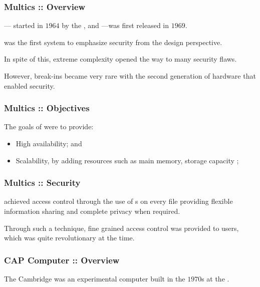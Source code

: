 \begin{frame}
  \frametitle{Multics :: Overview}

  ---
  started in $1964$ by the ,  and
  ---was first released in $1969$.

  \-

   was the first system to emphasize security from the
  design perspective.

  \-

  In spite of this,  extreme complexity opened the way to many
  security flaws.

  \-

  However, break-ins became very rare with the second generation of hardware
  that enabled  security.
\end{frame}


\begin{frame}
  \frametitle{Multics :: Objectives}

  The goals of  were to provide:

  \begin{itemize}
    \item
      High availability; and
    \item
      Scalability, by adding resources such as main memory, storage capacity
      \etc{};
  \end{itemize}
\end{frame}


\begin{frame}
  \frametitle{Multics :: Security}

   achieved access control through the use of s on every file providing flexible information sharing and
  complete privacy when required.

  \-

  Through such a technique, fine grained access control was provided to users,
  which was quite revolutionary at the time.
\end{frame}


\begin{frame}
  \frametitle{CAP Computer :: Overview}

  The Cambridge  was an experimental computer built
  in the $1970$s at the .
\end{frame}

